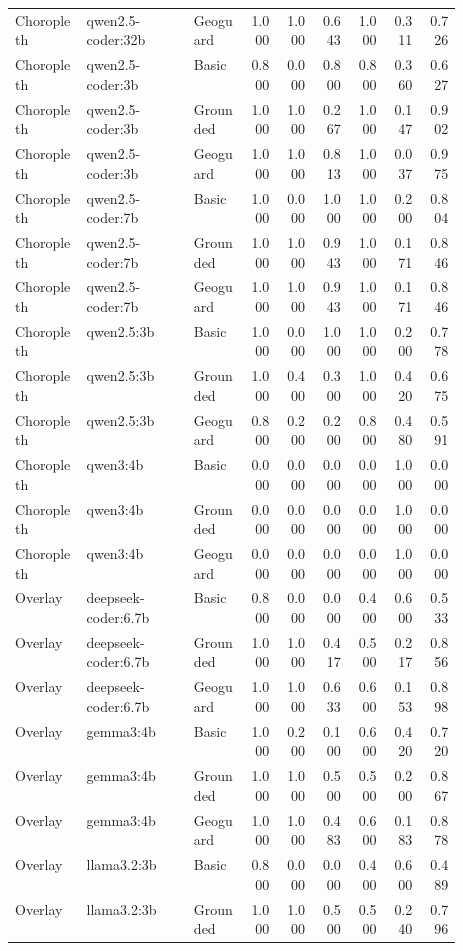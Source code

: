 \begin{longtable}{p{0.16\linewidth}p{0.24\linewidth}p{0.12\linewidth}rrrrrr}
Choropleth & qwen2.5-coder:32b & Geoguard & 1.000 & 1.000 & 0.643 & 1.000 & 0.311 & 0.726 \\
Choropleth & qwen2.5-coder:3b & Basic & 0.800 & 0.000 & 0.800 & 0.800 & 0.360 & 0.627 \\
Choropleth & qwen2.5-coder:3b & Grounded & 1.000 & 1.000 & 0.267 & 1.000 & 0.147 & 0.902 \\
Choropleth & qwen2.5-coder:3b & Geoguard & 1.000 & 1.000 & 0.813 & 1.000 & 0.037 & 0.975 \\
Choropleth & qwen2.5-coder:7b & Basic & 1.000 & 0.000 & 1.000 & 1.000 & 0.200 & 0.804 \\
Choropleth & qwen2.5-coder:7b & Grounded & 1.000 & 1.000 & 0.943 & 1.000 & 0.171 & 0.846 \\
Choropleth & qwen2.5-coder:7b & Geoguard & 1.000 & 1.000 & 0.943 & 1.000 & 0.171 & 0.846 \\
Choropleth & qwen2.5:3b & Basic & 1.000 & 0.000 & 1.000 & 1.000 & 0.200 & 0.778 \\
Choropleth & qwen2.5:3b & Grounded & 1.000 & 0.400 & 0.300 & 1.000 & 0.420 & 0.675 \\
Choropleth & qwen2.5:3b & Geoguard & 0.800 & 0.200 & 0.200 & 0.800 & 0.480 & 0.591 \\
Choropleth & qwen3:4b & Basic & 0.000 & 0.000 & 0.000 & 0.000 & 1.000 & 0.000 \\
Choropleth & qwen3:4b & Grounded & 0.000 & 0.000 & 0.000 & 0.000 & 1.000 & 0.000 \\
Choropleth & qwen3:4b & Geoguard & 0.000 & 0.000 & 0.000 & 0.000 & 1.000 & 0.000 \\
Overlay & deepseek-coder:6.7b & Basic & 0.800 & 0.000 & 0.000 & 0.400 & 0.600 & 0.533 \\
Overlay & deepseek-coder:6.7b & Grounded & 1.000 & 1.000 & 0.417 & 0.500 & 0.217 & 0.856 \\
Overlay & deepseek-coder:6.7b & Geoguard & 1.000 & 1.000 & 0.633 & 0.600 & 0.153 & 0.898 \\
Overlay & gemma3:4b & Basic & 1.000 & 0.200 & 0.100 & 0.600 & 0.420 & 0.720 \\
Overlay & gemma3:4b & Grounded & 1.000 & 1.000 & 0.500 & 0.500 & 0.200 & 0.867 \\
Overlay & gemma3:4b & Geoguard & 1.000 & 1.000 & 0.483 & 0.600 & 0.183 & 0.878 \\
Overlay & llama3.2:3b & Basic & 0.800 & 0.000 & 0.000 & 0.400 & 0.600 & 0.489 \\
Overlay & llama3.2:3b & Grounded & 1.000 & 1.000 & 0.500 & 0.500 & 0.240 & 0.796 \\

\end{longtable}

